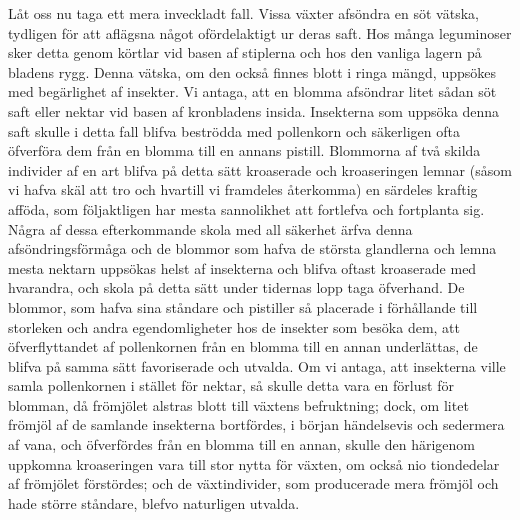 Låt oss nu taga ett mera inveckladt fall. Vissa växter afsöndra en söt vätska, tydligen för att aflägsna något ofördelaktigt ur deras saft. Hos många leguminoser sker detta genom körtlar vid basen af stiplerna och hos den vanliga lagern på bladens rygg. Denna vätska, om den också finnes blott i ringa mängd, uppsökes med begärlighet af insekter. Vi antaga, att en blomma afsöndrar litet sådan söt saft eller nektar vid basen af kronbladens insida. Insekterna som uppsöka denna saft skulle i detta fall blifva beströdda med pollenkorn och säkerligen ofta öfverföra dem från en blomma till en annans pistill. Blommorna af två skilda individer af en art blifva på detta sätt kroaserade och kroaseringen lemnar (såsom vi hafva skäl att tro och hvartill vi framdeles återkomma) en särdeles kraftig afföda, som följaktligen har mesta sannolikhet att fortlefva och fortplanta sig. Några af dessa efterkommande skola med all säkerhet ärfva denna afsöndringsförmåga och de blommor som hafva de största glandlerna och lemna mesta nektarn uppsökas helst af insekterna och blifva oftast kroaserade med hvarandra, och skola på detta sätt under tidernas lopp taga öfverhand. De blommor, som hafva sina ståndare och pistiller så placerade i förhållande till storleken och andra egendomligheter hos de insekter som besöka dem, att öfverflyttandet af pollenkornen från en blomma till en annan underlättas, de blifva på samma sätt favoriserade och utvalda. Om vi antaga, att insekterna ville samla pollenkornen i stället för nektar, så skulle detta vara en förlust för blomman, då frömjölet alstras blott till växtens befruktning; dock, om litet frömjöl af de samlande insekterna bortfördes, i början händelsevis och sedermera af vana, och öfverfördes från en blomma till en annan, skulle den härigenom uppkomna kroaseringen vara till stor nytta för växten, om också nio tiondedelar af frömjölet förstördes; och de växtindivider, som producerade mera frömjöl och hade större ståndare, blefvo naturligen utvalda.

